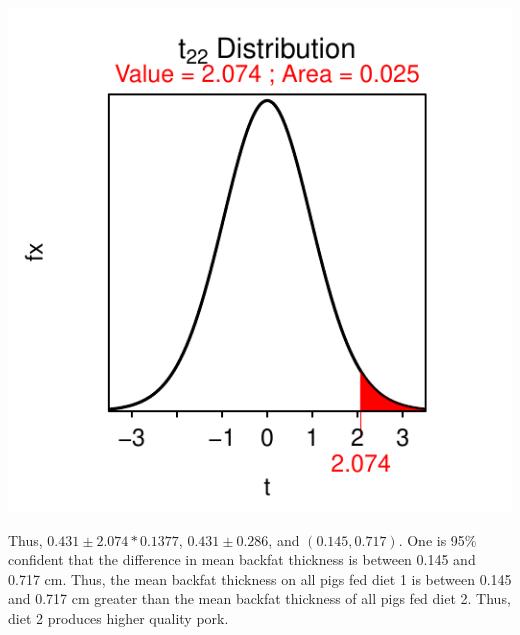 \documentclass[10pt,openany]{book}\usepackage[]{graphicx}\usepackage[]{color}
\newenvironment{knitrout}{}{} %
\begin{document}
\begin{itemize}
\begin{enumerate}
\begin{knitrout}
{\centering \includegraphics[width=.4\linewidth]{Figs/unnamed-chunk-378-1} 

}



\end{knitrout}
Thus, $0.431\pm2.074*0.1377$, $0.431\pm0.286$, and $(0.145,0.717)$.  One is 95\% confident that the difference in mean backfat thickness is between 0.145 and 0.717 cm.  Thus, the mean backfat thickness on all pigs fed diet 1 is between 0.145 and 0.717 cm greater than the mean backfat thickness of all pigs fed diet 2.  Thus, diet 2 produces higher quality pork.
    \end{enumerate}


\end{itemize}
\end{document}
